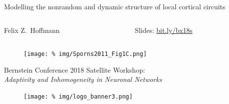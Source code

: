 \begin{frame}
  \vspace{0.6cm}
  
  \begin{center} 
    \huge Modelling the nonrandom and dynamic structure of local
    cortical circuits
  \end{center}
  
  \vspace{0.5cm}

  \large
  \begin{columns}[t]
    \hfill\Large
    \begin{column}{0.4\textwidth}
      \minipage[c][0.2\textheight][s]{\columnwidth}
      \hspace{0.6cm} Felix Z.~Hoffmann \textcolor{white}{y}
      \endminipage                 
    \end{column}
    \begin{column}{0.4\textwidth}
      \minipage[c][0.2\textheight][s]{\columnwidth}
      \hspace{0.6cm} Slides: \href{http://bit.ly/bx18s}{bit.ly/bx18s}
      \endminipage           
    \end{column}
    \hfill
  \end{columns}

  \vspace{-1cm}

  \begin{figure}
    \centering
    \texttt{[image: \%
      img/Sporns2011\_Fig1C.png]} %
    \nocite{Sporns2011}
  \end{figure}


  \begin{center}
    \Large Bernstein Conference 2018 Satellite Workshop:\\
    \textit{Adaptivity and Inhomogeneity in Neuronal Networks}
  \end{center}

  \vspace{0.2cm}
  
  \begin{figure}
    \centering
    \texttt{[image: \%
      img/logo\_banner3.png]} %
  \end{figure}



\end{frame}

